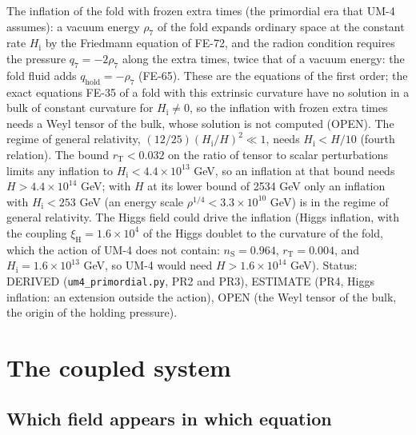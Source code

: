 \documentclass[
  10pt,
]{article}
\begin{document}
The inflation of the fold with frozen extra times (the primordial era
that UM-4 assumes): a vacuum energy \(\rho_7\) of the fold expands
ordinary space at the constant rate \(H_{\mathrm{i}}\) by the Friedmann
equation of FE-72, and the radion condition requires the pressure
\(q_7 = -2\rho_7\) along the extra times, twice that of a vacuum energy:
the fold fluid adds \(q_{\mathrm{hold}} = -\rho_7\) (FE-65). These are
the equations of the first order; the exact equations FE-35 of a fold
with this extrinsic curvature have no solution in a bulk of constant
curvature for \(H_{\mathrm{i}} \ne 0\), so the inflation with frozen
extra times needs a Weyl tensor of the bulk, whose solution is not
computed (OPEN). The regime of general relativity,
\((12/25)(H_{\mathrm{i}}/H)^2 \ll 1\), needs \(H_{\mathrm{i}} < H/10\)
(fourth relation). The bound \(r_{\mathrm{T}} < 0.032\) on the ratio of
tensor to scalar perturbations limits any inflation to
\(H_{\mathrm{i}} < 4.4\times10^{13}\) GeV, so an inflation at that bound
needs \(H > 4.4\times10^{14}\) GeV; with \(H\) at its lower bound of
2534 GeV only an inflation with \(H_{\mathrm{i}} < 253\) GeV (an energy
scale \(\rho^{1/4} < 3.3\times10^{10}\) GeV) is in the regime of general
relativity. The Higgs field could drive the inflation (Higgs inflation,
with the coupling \(\xi_{\mathrm{H}} = 1.6\times10^4\) of the Higgs
doublet to the curvature of the fold, which the action of UM-4 does not
contain: \(n_{\mathrm{S}} = 0.964\), \(r_{\mathrm{T}} = 0.004\), and
\(H_{\mathrm{i}} = 1.6\times10^{13}\) GeV, so UM-4 would need
\(H > 1.6\times10^{14}\) GeV). Status: DERIVED
(\texttt{um4\_primordial.py}, PR2 and PR3), ESTIMATE (PR4, Higgs
inflation: an extension outside the action), OPEN (the Weyl tensor of
the bulk, the origin of the holding pressure).

\hypertarget{the-coupled-system}{%
\section{The coupled system}\label{the-coupled-system}}

\hypertarget{which-field-appears-in-which-equation}{%
\subsection{Which field appears in which
equation}\label{which-field-appears-in-which-equation}}
\end{document}
